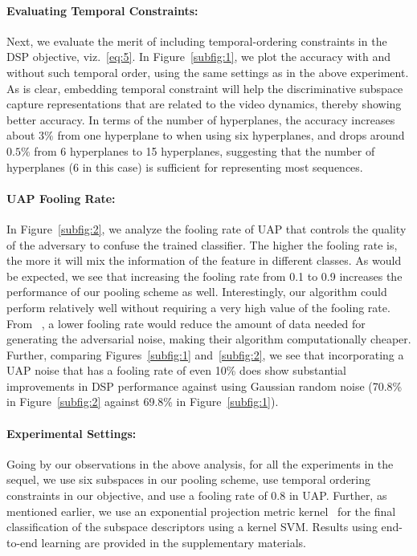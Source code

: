 \documentclass[runningheads]{llncs}
\newcommand{\para}[1]{\noindent\paragraph*{\textbf{#1}}}
\begin{document}
\para{Evaluating Temporal Constraints:} Next, we evaluate the merit of including temporal-ordering constraints in the DSP objective, viz.~\eqref{eq:5}. In Figure~\ref{subfig:1}, we plot the accuracy with and without such temporal order, using the same settings as in the above experiment. As is clear, embedding temporal constraint will help the discriminative subspace capture representations that are related to the video dynamics, thereby showing better accuracy. In terms of the number of hyperplanes, the accuracy increases about $3\%$ from one hyperplane to when using six hyperplanes, and drops around $0.5\%$ from 6 hyperplanes to 15 hyperplanes, suggesting that the number of hyperplanes (6 in this case) is sufficient for representing most sequences. 

\para{UAP Fooling Rate:} In Figure~\ref{subfig:2}, we analyze the fooling rate of UAP that controls the quality of the adversary to confuse the trained classifier. The higher the fooling rate is, the more it will mix the information of the feature in different classes. As would be expected, we see that increasing the fooling rate from 0.1 to 0.9 increases the performance of our pooling scheme as well. Interestingly, our algorithm could perform relatively well without requiring a very high value of the fooling rate. From ~\cite{moosavi2017universal}, a lower fooling rate would reduce the amount of data needed for generating the adversarial noise, making their algorithm computationally cheaper. Further, comparing Figures~\ref{subfig:1} and~\ref{subfig:2}, we see that incorporating a UAP noise that has a fooling rate of even 10\% does show substantial improvements in DSP performance against using Gaussian random noise (70.8\% in Figure~\ref{subfig:2} against 69.8\% in Figure~\ref{subfig:1}).



\paragraph*{\textbf{Experimental Settings:}} Going by our observations in the above analysis, for all the experiments in the sequel, we use six subspaces in our pooling scheme, use temporal ordering constraints in our objective, and use a fooling rate of 0.8 in UAP. Further, as mentioned earlier, we use an exponential projection metric kernel~\cite{cherian2018non} for the final classification of the subspace descriptors using a kernel SVM. Results using end-to-end learning are provided in the supplementary materials. 
\end{document}
